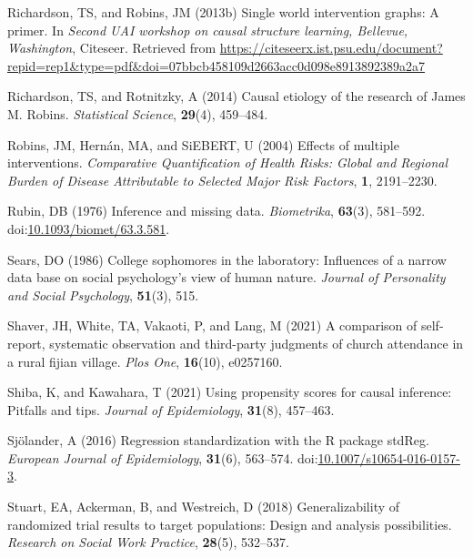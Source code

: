 \documentclass[
  single column]{article}
\newlength{\cslhangindent}
\newenvironment{CSLReferences}[2] %
 {\begin{list}{}{%
  \setlength{\itemindent}{0pt}
  \setlength{\leftmargin}{0pt}
  \setlength{\parsep}{0pt}
  \ifodd #1
   \setlength{\leftmargin}{\cslhangindent}
   \setlength{\itemindent}{-1\cslhangindent}
  \fi
  \setlength{\itemsep}{#2\baselineskip}}}
 {\end{list}}
\begin{document}
\begin{CSLReferences}{1}{0}
Richardson, TS, and Robins, JM (2013b) Single world intervention graphs:
A primer. In \emph{Second UAI workshop on causal structure learning,
{B}ellevue, {W}ashington}, Citeseer. Retrieved from
\url{https://citeseerx.ist.psu.edu/document?repid=rep1&type=pdf&doi=07bbcb458109d2663acc0d098e8913892389a2a7}

Richardson, TS, and Rotnitzky, A (2014) Causal etiology of the research
of {J}ames {M}. {R}obins. \emph{Statistical Science}, \textbf{29}(4),
459--484.

Robins, JM, Hernán, MA, and SiEBERT, U (2004) Effects of multiple
interventions. \emph{Comparative Quantification of Health Risks: Global
and Regional Burden of Disease Attributable to Selected Major Risk
Factors}, \textbf{1}, 2191--2230.

Rubin, DB (1976) Inference and missing data. \emph{Biometrika},
\textbf{63}(3), 581--592.
doi:\href{https://doi.org/10.1093/biomet/63.3.581}{10.1093/biomet/63.3.581}.

Sears, DO (1986) College sophomores in the laboratory: Influences of a
narrow data base on social psychology's view of human nature.
\emph{Journal of Personality and Social Psychology}, \textbf{51}(3),
515.

Shaver, JH, White, TA, Vakaoti, P, and Lang, M (2021) A comparison of
self-report, systematic observation and third-party judgments of church
attendance in a rural fijian village. \emph{Plos One}, \textbf{16}(10),
e0257160.

Shiba, K, and Kawahara, T (2021) Using propensity scores for causal
inference: Pitfalls and tips. \emph{Journal of Epidemiology},
\textbf{31}(8), 457--463.

Sjölander, A (2016) Regression standardization with the R package
stdReg. \emph{European Journal of Epidemiology}, \textbf{31}(6),
563--574.
doi:\href{https://doi.org/10.1007/s10654-016-0157-3}{10.1007/s10654-016-0157-3}.

Stuart, EA, Ackerman, B, and Westreich, D (2018) Generalizability of
randomized trial results to target populations: Design and analysis
possibilities. \emph{Research on Social Work Practice}, \textbf{28}(5),
532--537.


\end{CSLReferences}
\end{document}
